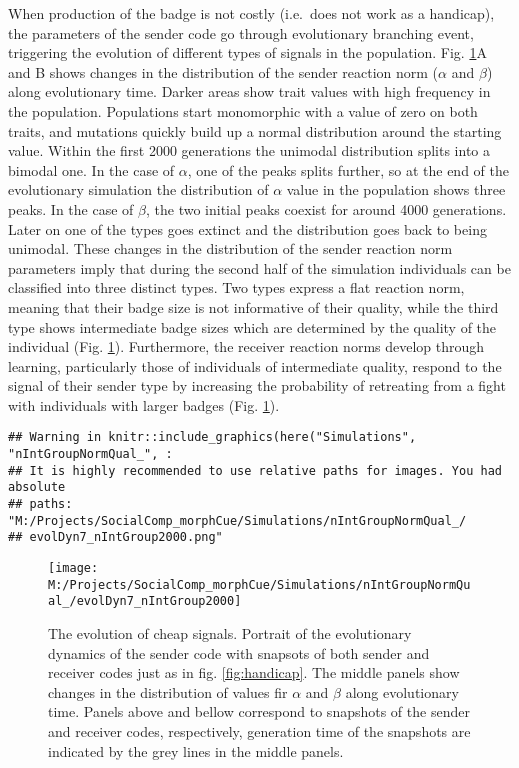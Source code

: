 \documentclass[
  12pt,
]{article}
\begin{document}
When production of the badge is not costly (i.e.~does not work as a
handicap), the parameters of the sender code go through evolutionary
branching event, triggering the evolution of different types of signals
in the population. Fig. \ref{fig:branching}A and B shows changes in the
distribution of the sender reaction norm (\(\alpha\) and \(\beta\))
along evolutionary time. Darker areas show trait values with high
frequency in the population. Populations start monomorphic with a value
of zero on both traits, and mutations quickly build up a normal
distribution around the starting value. Within the first 2000
generations the unimodal distribution splits into a bimodal one. In the
case of \(\alpha\), one of the peaks splits further, so at the end of
the evolutionary simulation the distribution of \(\alpha\) value in the
population shows three peaks. In the case of \(\beta\), the two initial
peaks coexist for around 4000 generations. Later on one of the types
goes extinct and the distribution goes back to being unimodal. These
changes in the distribution of the sender reaction norm parameters imply
that during the second half of the simulation individuals can be
classified into three distinct types. Two types express a flat reaction
norm, meaning that their badge size is not informative of their quality,
while the third type shows intermediate badge sizes which are determined
by the quality of the individual (Fig. \ref{fig:branching}).
Furthermore, the receiver reaction norms develop through learning,
particularly those of individuals of intermediate quality, respond to
the signal of their sender type by increasing the probability of
retreating from a fight with individuals with larger badges (Fig.
\ref{fig:branching}).

\begin{verbatim}
## Warning in knitr::include_graphics(here("Simulations", "nIntGroupNormQual_", :
## It is highly recommended to use relative paths for images. You had absolute
## paths: "M:/Projects/SocialComp_morphCue/Simulations/nIntGroupNormQual_/
## evolDyn7_nIntGroup2000.png"
\end{verbatim}

\begin{figure}

{\centering \texttt{[image: M:/Projects/SocialComp\_morphCue/Simulations/nIntGroupNormQual\_/evolDyn7\_nIntGroup2000]} 

}

\caption{The evolution of cheap signals. Portrait of the evolutionary dynamics of the sender code with snapsots of both sender and receiver codes just as in fig. \ref{fig:handicap}. The middle panels show changes in the distribution of values fir $\alpha$ and $\beta$ along evolutionary time. Panels above and bellow correspond to snapshots of the sender and receiver codes, respectively, generation time of the snapshots are indicated by the grey lines in the middle panels.}\label{fig:branching}
\end{figure}
\end{document}
